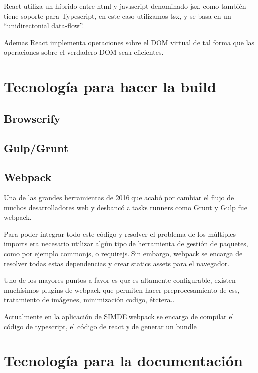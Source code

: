 \bigskip
React utiliza un híbrido entre html y javascript denominado jsx, como también tiene soporte para 
Typescript, en este caso utilizamos tsx, y se basa en un “unidirectonial data-flow”. 

\bigskip
Ademas React implementa operaciones sobre el DOM virtual de tal forma que las operaciones sobre
el verdadero DOM sean eficientes.

\section{Tecnología para hacer la build}
\label{3:sec3}

\subsection{Browserify}

\subsection{Gulp/Grunt}

\subsection{Webpack}
\bigskip
Una de las grandes herramientas de 2016 que acabó por cambiar el flujo de muchos 
desarrolladores web y desbancó a tasks runners como Grunt y Gulp fue webpack.

\bigskip
Para poder integrar todo este código y resolver el problema de los múltiples imports 
era necesario utilizar algún tipo de herramienta de gestión de paquetes, como por ejemplo 
commonjs, o requirejs. Sin embargo, webpack se encarga de resolver todas estas 
dependencias y crear statics assets para el navegador.

\bigskip
Uno de los mayores puntos a favor es que es altamente configurable, existen muchísimos 
plugins de webpack que permiten hacer preprocesamiento de css, tratamiento de imágenes,
minimización codigo, étctera.. 

\bigskip
Actualmente en la aplicación de SIMDE webpack  se encarga de compilar el código de 
typescript, el código de react y de generar un bundle 

\section{Tecnología para la documentación}
\label{3:sec4}

